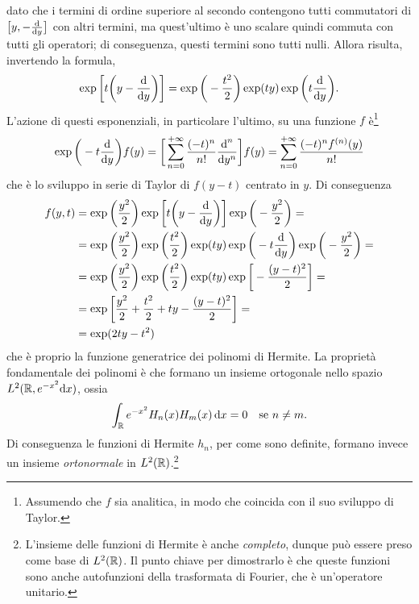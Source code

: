 dato che i termini di ordine superiore al secondo contengono tutti commutatori di $\big[y,-\drv{}{y}\big]$ con altri termini, ma quest'ultimo è uno scalare quindi commuta con tutti gli operatori; di conseguenza, questi termini sono tutti nulli.
Allora risulta, invertendo la formula,
\begin{equation}
	\exp\bigg[t\bigg(y-\drv{}{y}\bigg)\bigg]=\exp\bigg(-\frac{t^2}2\bigg)\exp(ty)\exp\bigg(t\drv{}{y}\bigg).
\end{equation}
L'azione di questi esponenziali, in particolare l'ultimo, su una funzione $f$ è\footnote{Assumendo che $f$ sia analitica, in modo che coincida con il suo sviluppo di Taylor.}
\begin{equation}
	\exp\bigg(-t\drv{}{y}\bigg)f(y)=\bigg[\sum_{n=0}^{+\infty}\frac{(-t)^n}{n!}\frac{\dd^n}{\dd y^n}\bigg]f(y)=\sum_{n=0}^{+\infty}\frac{(-t)^nf^{(n)}(y)}{n!}
\end{equation}
che è lo sviluppo in serie di Taylor di $f(y-t)$ centrato in $y$.
Di conseguenza
\begin{equation}
	\begin{split}
		f(y,t)&=\exp\bigg(\frac{y^2}2\bigg)\exp\bigg[t\bigg(y-\drv{}{y}\bigg)\bigg]\exp\bigg(-\frac{y^2}2\bigg)=\\
		&=\exp\bigg(\frac{y^2}2\bigg)\exp\bigg(\frac{t^2}2\bigg)\exp(ty)\exp\bigg(-t\drv{}{y}\bigg)\exp\bigg(-\frac{y^2}2\bigg)=\\
		&=\exp\bigg(\frac{y^2}2\bigg)\exp\bigg(\frac{t^2}2\bigg)\exp(ty)\exp\bigg[-\frac{(y-t)^2}2\bigg]=\\
		&=\exp\bigg[\frac{y^2}2+\frac{t^2}2+ty-\frac{(y-t)^2}2\bigg]=\\
		&=\exp(2ty-t^2)
	\end{split}
\end{equation}
che è proprio la funzione generatrice dei polinomi di Hermite.
La proprietà fondamentale dei polinomi è che formano un insieme ortogonale nello spazio $\leb[2]{\R,e^{-x^2}\dd x}$, ossia
\begin{equation}
	\int_{\R}e^{-x^2}H_n(x)H_m(x)\,\dd x=0\quad\text{se }n\ne m.
	\label{eq:ortogonalita-polinomi-hermite}
\end{equation}
Di conseguenza le funzioni di Hermite $h_n$, per come sono definite, formano invece un insieme \emph{ortonormale} in $\leb[2]{\R}$.\footnote{L'insieme delle funzioni di Hermite è anche \emph{completo}, dunque può essere preso come base di $\leb[2]{\R}$. Il punto chiave per dimostrarlo è che queste funzioni sono anche autofunzioni della trasformata di Fourier, che è un'operatore unitario.}


